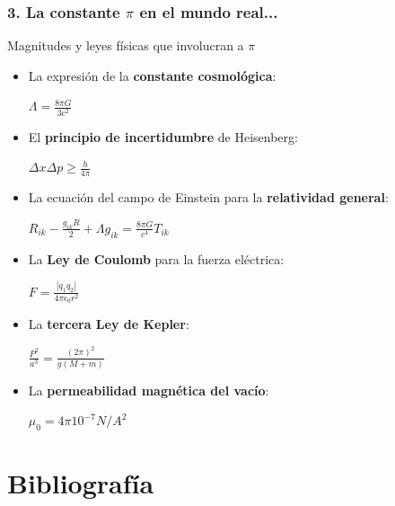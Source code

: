\documentclass{beamer}
\begin{document}
\begin{frame}
\frametitle{3. La constante $\pi$ en el mundo real...}
\begin{block}{Magnitudes y leyes físicas que involucran a $\pi$}

\begin{itemize}
    \item 
      La expresión de la \textbf{constante cosmológica}: 
      \begin{center}
      $\Lambda = \frac{8 \pi G}{3 c^{2}}$
      \end{center}
      \pause
    \item
      El \textbf{principio de incertidumbre} de Heisenberg:
      \begin{center}
      $\Delta x \Delta p \geq \frac{h}{4\pi}$
      \end{center}
      \pause
    \item
      La ecuación del campo de Einstein para la \textbf{relatividad general}:
      \begin{center}
      $R_{ik} - \frac{g_{ik}R}{2} + \Lambda g_{ik} = \frac{8 \pi G}{c^{4}}T_{ik}$
      \end{center}
      \pause
    \item
      La \textbf{Ley de Coulomb} para la fuerza eléctrica:
      \begin{center}
      $F = \frac{|q_{1}q_{2}|}{4 \pi \epsilon_{0} r^{2}}$
      \end{center}
      \pause
    \item
      La \textbf{tercera Ley de Kepler}:
      \begin{center}
      $\frac{P^{2}}{a^{3}} = \frac{(2\pi)^{2}}{g(M + m)}$
      \end{center}
      \pause
    \item
      La \textbf{permeabilidad magnética del vacío}:
      \begin{center}
      $\mu_{0} = 4\pi 10^{-7} N/A^{2}$
      \end{center}
\end{itemize}

\end{block}
\end{frame}


\section{Bibliografía}
\end{document}
